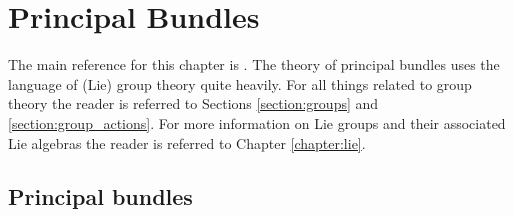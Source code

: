 \chapter{Principal Bundles}\label{chapter:principal_bundles}

    The main reference for this chapter is \cite{principal_bundles}. The theory of principal bundles uses the language of (Lie) group theory quite heavily. For all things related to group theory the reader is referred to Sections \ref{section:groups} and \ref{section:group_actions}. For more information on Lie groups and their associated Lie algebras the reader is referred to Chapter \ref{chapter:lie}.

\section{Principal bundles}

